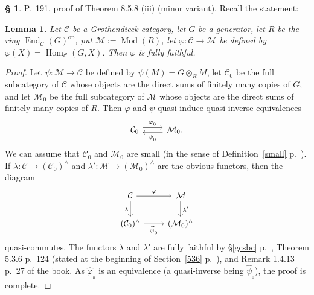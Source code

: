 \documentclass[12pt]{article}%
\newtheorem{lem}[thm]{Lemma}
\theoremstyle{remark}
\theoremstyle{definition}
\newtheorem{s}[thm]{\S}%
\newcommand{\C}{\mathcal C}
\newcommand{\M}{\mathcal M}
\DeclareMathOperator{\Hom}{Hom}%
\DeclareMathOperator{\Mod}{Mod}
\DeclareMathOperator{\op}{op}
\begin{document}
\begin{s} P.~191, proof of Theorem 8.5.8 (iii) (minor variant). Recall the statement: 
%
\begin{lem}\label{858iii}
%
Let $\C$ be a Grothendieck category, let $G$ be a generator, let $R$ be the ring $\operatorname{End}_\C(G)^{\op}$, put $\M:=\Mod(R)$, let $\varphi:\C\to\M$ be defined by $\varphi(X)=\Hom_\C(G,X)$. Then $\varphi$ is fully faithful. 
%
\end{lem}
%
\begin{proof}
Let $\psi:\M\to\C$ be defined by $\psi(M)=G\otimes_RM$, let $\C_0$ be the full subcategory of $\C$ whose objects are the direct sums of finitely many copies of $G$, and let $\M_0$ be the full subcategory of $\M$ whose objects are the direct sums of finitely many copies of $R$. Then $\varphi$ and $\psi$ quasi-induce quasi-inverse equivalences 
$$
\begin{tikzcd}
\C_0\ar[yshift=.7ex]{r}{\varphi_{{}_0}}&\M_0.\ar[yshift=-.7ex]{l}{\psi_{{}_0}}
\end{tikzcd}
$$ 
We can assume that $\C_0$ and $\M_0$ are small (in the sense of Definition~\ref{small} p.~\pageref{small}). If $\lambda:\C\to(\C_0)^\wedge$ and $\lambda':\M\to(\M_0)^\wedge$ are the obvious functors, then the diagram 
$$
\begin{tikzcd}
\C\ar{r}{\varphi}\ar{d}[swap]{\lambda}&\M\ar{d}{\lambda'}\\
(\C_0)^\wedge\ar{r}[swap]{\widehat\varphi_{{}_0}}&(\M_0)^\wedge
\end{tikzcd}
$$ 
quasi-commutes. The functors $\lambda$ and $\lambda'$ are fully faithful by \S\ref{gcsbc} p.~\pageref{gcsbc}, Theorem 5.3.6 p.~124 (stated at the beginning of Section~\ref{536} p.~\pageref{536}), and Remark 1.4.13 p.~27 of the book. As $\widehat\varphi_{{}_0}$ is an equivalence (a quasi-inverse being $\widehat\psi_{{}_0}$), the proof is complete.
\end{proof}
\end{s}

%
\end{document}
